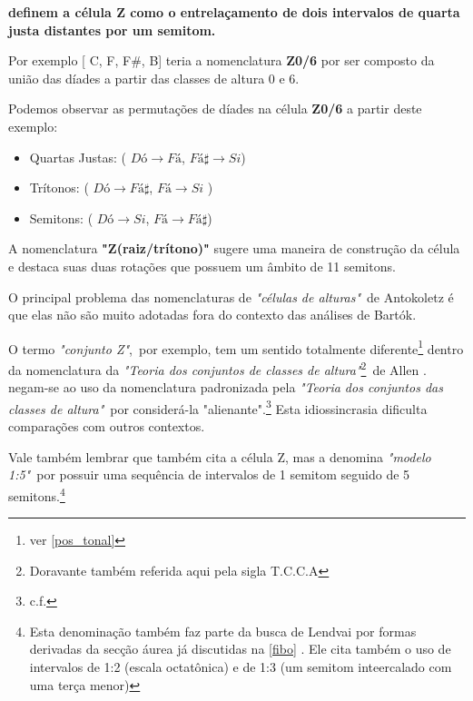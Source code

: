 \documentclass[
	12pt,				%
	openright,			%
	twoside,			%
	a4paper,			%
	english,			%
	french,				%
	spanish,			%
	brazil				%
	]{abntex2}
\begin{document}
 \textbf{definem a célula Z como o entrelaçamento de dois intervalos de quarta justa distantes por um semitom.} 

Por exemplo [ C, F, F\#, B] teria a nomenclatura \textbf{Z0/6} por ser composto da união das díades a partir das classes de altura 0 e 6. 

Podemos observar as permutações de díades na célula \textbf{Z0/6} a partir deste exemplo:

\begin{itemize}
\item Quartas Justas: ( $Dó \rightarrow Fá$, $Fá\sharp \rightarrow Si$) 

\item Trítonos: ( $Dó \rightarrow Fá\sharp$, $Fá \rightarrow Si$ )

\item Semitons: ( $Dó \rightarrow Si$, $Fá \rightarrow Fá\sharp$)
\end{itemize}


A nomenclatura \textbf{"Z(raiz/trítono)"} sugere uma maneira de construção da célula e destaca suas duas rotações que possuem um âmbito de 11 semitons. 

O principal problema das nomenclaturas de \textit{"células de alturas"}\ de Antokoletz é que elas não são muito adotadas fora do contexto das análises de Bartók.

O termo \textit{"conjunto Z"},\ por exemplo, tem um sentido totalmente diferente\footnote{ver \autoref{pos_tonal} } dentro da nomenclatura da  \textit{"Teoria dos conjuntos de classes de altura"}\footnote{Doravante também referida aqui pela sigla T.C.C.A}\ de Allen .  negam-se ao uso da nomenclatura padronizada pela \textit{"Teoria dos conjuntos das classes de altura"}\ por considerá-la "alienante".\footnote{c.f. } Esta idiossincrasia dificulta comparações com outros contextos.

Vale também lembrar que \cite[p. 51]{lendvai1971bela} também cita a célula Z, mas a denomina \textit{"modelo 1:5"}\ por possuir uma sequência de intervalos de 1 semitom seguido de 5 semitons.\footnote{Esta denominação também faz parte da busca de Lendvai por formas derivadas da secção áurea já discutidas na \autoref{fibo} . Ele cita também o uso de intervalos de 1:2 (escala octatônica) e de 1:3 (um semitom inteercalado com uma terça menor) } 
\end{document}
